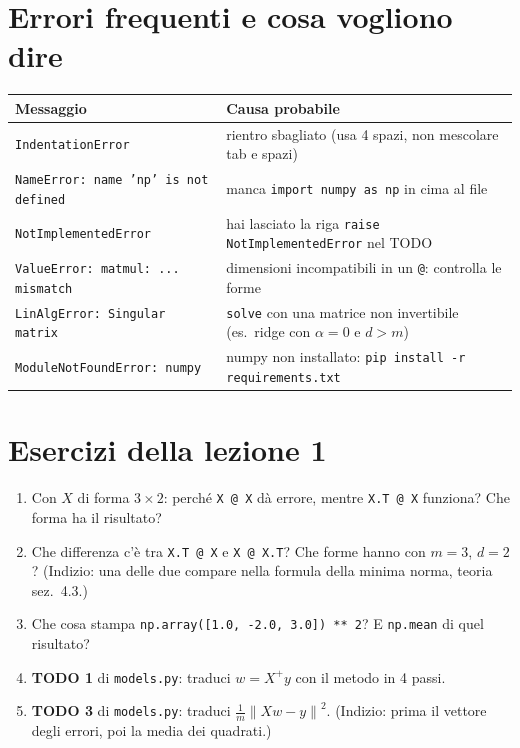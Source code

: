 \documentclass[11pt,a4paper]{article}
\newcommand{\norm}[1]{\left\lVert #1 \right\rVert}
\begin{document}
\section{Errori frequenti e cosa vogliono dire}
\begin{center}
\begin{tabular}{@{}p{5.2cm}p{9.3cm}@{}}
\toprule
Messaggio & Causa probabile \\
\midrule
\texttt{IndentationError} & rientro sbagliato (usa 4 spazi, non mescolare tab e spazi) \\
\texttt{NameError: name 'np' is not defined} & manca \texttt{import numpy as np} in cima al file \\
\texttt{NotImplementedError} & hai lasciato la riga \texttt{raise NotImplementedError} nel TODO \\
\texttt{ValueError: matmul: ... mismatch} & dimensioni incompatibili in un \texttt{@}: controlla le forme \\
\texttt{LinAlgError: Singular matrix} & \texttt{solve} con una matrice non invertibile (es.\ ridge con $\alpha=0$ e $d>m$) \\
\texttt{ModuleNotFoundError: numpy} & numpy non installato: \texttt{pip install -r requirements.txt} \\
\bottomrule
\end{tabular}
\end{center}

\section{Esercizi della lezione 1}
\begin{enumerate}
  \item Con $X$ di forma $3\times 2$: perché \texttt{X @ X} dà errore, mentre \texttt{X.T @ X} funziona? Che forma ha il risultato?
  \item Che differenza c'è tra \texttt{X.T @ X} e \texttt{X @ X.T}? Che forme hanno con $m=3$, $d=2$?
        (Indizio: una delle due compare nella formula della minima norma, teoria sez.~4.3.)
  \item Che cosa stampa \texttt{np.array([1.0, -2.0, 3.0]) ** 2}? E \texttt{np.mean} di quel risultato?
  \item \textbf{TODO 1} di \texttt{models.py}: traduci $w = X^{+}y$ con il metodo in 4 passi.
  \item \textbf{TODO 3} di \texttt{models.py}: traduci $\frac{1}{m}\norm{Xw - y}^2$. (Indizio: prima il vettore degli errori, poi la media dei quadrati.)
\end{enumerate}
\end{document}
